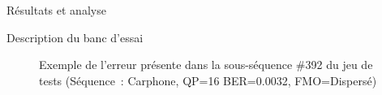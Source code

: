 \documentclass[letterpaper, twoside, 12pt,memoire]{thETS}
\begin{document}
\begin{chapter}{Résultats et analyse}
\begin{section}{Description du banc d'essai}
\begin{figure}[htb]
\caption{Exemple de l'erreur présente dans la sous-séquence \#392 du jeu de
tests (Séquence~: Carphone, QP=16 BER=0.0032, FMO=Dispersé)}
\label{fig-392}
\end{figure}


\end{section}
\end{chapter}
\end{document}
